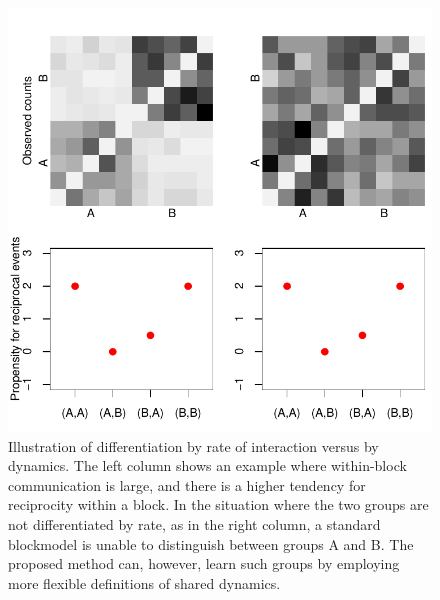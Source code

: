 \begin{figure}
\centering
\includegraphics[scale=.8]{../figs/introexample/all}
\caption{Illustration of differentiation by rate of interaction versus by dynamics.  The left column shows an example where within-block communication is large, and there is a higher tendency for reciprocity within a block.  In the situation where the two groups are not differentiated by rate, as in the right column, a standard blockmodel is unable to distinguish between groups A and B.  The proposed method can, however, learn such groups by employing more flexible definitions of shared dynamics.}
\label{fig:example}
\end{figure}

